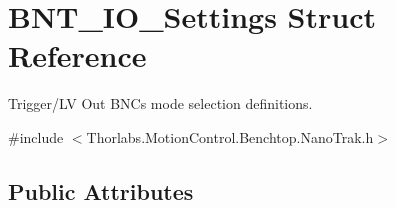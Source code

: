 \hypertarget{struct_b_n_t___i_o___settings}{}\section{B\+N\+T\+\_\+\+I\+O\+\_\+\+Settings Struct Reference}
\label{struct_b_n_t___i_o___settings}


Trigger/\+LV Out B\+N\+Cs mode selection definitions.  




{\ttfamily \#include $<$Thorlabs.\+Motion\+Control.\+Benchtop.\+Nano\+Trak.\+h$>$}

\subsection*{Public Attributes}
